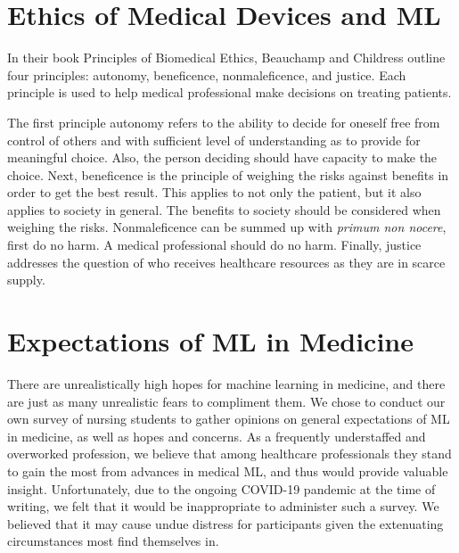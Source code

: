\documentclass[]{article}
\begin{document}
	\section{Ethics of Medical Devices and ML}\label{ethics}

		In their book Principles of Biomedical Ethics, Beauchamp and Childress outline four principles: autonomy, beneficence, nonmaleficence, and justice. Each principle is used to help medical professional make decisions on treating patients.

		The first principle autonomy refers to the ability to decide for oneself free from control of others and with sufficient level of understanding as to provide for meaningful choice. Also, the person deciding should have capacity to make the choice. Next, beneficence is the principle of weighing the risks against benefits in order to get the best result. This applies to not only the patient, but it also applies to society in general. The benefits to society should be considered when weighing the risks. Nonmaleficence can be summed up with \emph{primum non nocere}, first do no harm. A medical professional should do no harm. Finally, justice addresses the question of who receives healthcare resources as they are in scarce supply.

	\section{Expectations of ML in Medicine}

		There are unrealistically high hopes for machine learning in medicine\cite{Chen2017,10.1001/jama.2017.18391}, and there are just as many unrealistic fears to compliment them\cite{bbc2016rroai}. We chose to conduct our own survey of nursing students to gather opinions on general expectations of ML in medicine, as well as hopes and concerns. As a frequently understaffed and overworked profession\cite{doi:10.1111/j.1365-2648.2009.05082.x}, we believe that among healthcare professionals they stand to gain the most from advances in medical ML, and thus would provide valuable insight. Unfortunately, due to the ongoing COVID-19 pandemic at the time of writing, we felt that it would be inappropriate to administer such a survey. We believed that it may cause undue distress for participants given the extenuating circumstances most find themselves in.
\end{document}
